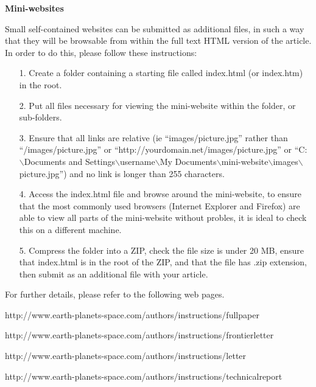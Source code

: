 \documentclass{EPS}
\begin{document}
\noindent
\textbf{Mini-websites}

Small self-contained websites can be submitted as additional files,
in such a way that they will be browsable from within the
full text HTML version of the article.
In order to do this, please follow these instructions:
\begin{enumerate}
\item[1.]
Create a folder containing a starting file called index.html
(or index.htm) in the root.
\item[2.]
Put all files necessary for viewing the mini-website
within the folder, or sub-folders.
\item[3.]
Ensure that all links are relative
(ie ``images/picture.jpg'' rather than
``/images/picture.jpg'' or
``http://yourdomain.net/images/picture.jpg'' or
``C:$\backslash$Documents and Settings$\backslash$username$\backslash$My Documents$\backslash$mini-website$\backslash$images$\backslash$picture.jpg'') and
no link is longer than 255 characters.
\item[4.]
Access the index.html file and browse around the mini-website,
to ensure that the most commonly used browsers
(Internet Explorer and Firefox) are able to view
all parts of the mini-website without probles,
it is ideal to check this on a different machine.
\item[5.]
Compress the folder into a ZIP, check the file size is under 20 MB,
ensure that index.html is in the root of the ZIP,
and that the file has .zip extension, then
submit as an additional file with your article.
\end{enumerate}
For further details, please refer to the following web pages.

http://www.earth-planets-space.com/authors/instructions/fullpaper

http://www.earth-planets-space.com/authors/instructions/frontierletter

http://www.earth-planets-space.com/authors/instructions/letter

http://www.earth-planets-space.com/authors/instructions/technicalreport
\end{document}

